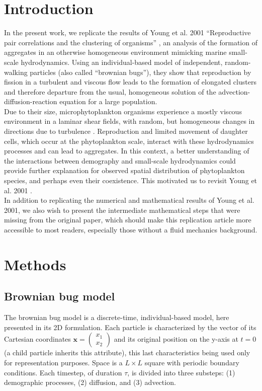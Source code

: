 
\section*{Introduction}

In the present work, we replicate the results of Young et al. 2001 ``Reproductive pair correlations and the clustering of organisms'' \cite{young_reproductive_2001}, an analysis of the formation of aggregates in an otherwise homogeneous environment mimicking marine small-scale hydrodynamics. Using an individual-based model of independent, random-walking particles (also called ``brownian bugs''), they show that reproduction by fission in a turbulent and viscous flow leads to the formation of elongated clusters and therefore departure from the usual, homogeneous solution of the advection-diffusion-reaction equation for a large population. \\

Due to their size, microphytoplankton organisms experience a mostly viscous environment in a laminar shear fields, with random, but homogeneous changes in directions due to turbulence \citep{peters_effects_2000}. Reproduction and limited movement of daughter cells, which occur at the phytoplankton scale, interact with these hydrodynamics processes and can lead to aggregates.  In this context, a better understanding of the interactions between demography and small-scale hydrodynamics could provide further explanation for observed spatial distribution of phytoplankton species, and perhaps even their coexistence. This motivated us to revisit Young et al. 2001  \cite{young_reproductive_2001}. \\

In addition to replicating the numerical and mathematical results of Young et al. 2001, we also wish to present the intermediate mathematical steps that were missing from the original paper, which should make this replication article more accessible to most readers, especially those without a fluid mechanics background.  %
 
\section*{Methods}

\subsection*{Brownian bug model}
The brownian bug model is a discrete-time, individual-based model, here presented in its 2D formulation. Each particle is characterized by the vector of its Cartesian coordinates $\boldsymbol{x}=\begin{pmatrix} 
      x_1\\ 
      x_2 
\end{pmatrix}$ and its original position on the y-axis at $t=0$ (a child particle inherits this attribute), this last characteristics being used only for representation purposes. Space is a $L\times L$ square with periodic boundary conditions. Each timestep, of duration $\tau$, is divided into three substeps: (1) demographic processes, (2) diffusion, and (3) advection. \\


